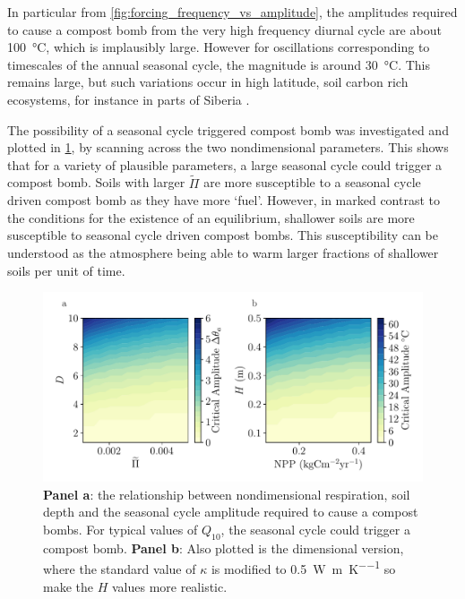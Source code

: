 In particular from \cref{fig:forcing_frequency_vs_amplitude}, 
the amplitudes required to cause a compost bomb from the very high frequency diurnal cycle are about \SI{100}{\degreeCelsius}, which is implausibly large.
However for oscillations corresponding to timescales of the annual seasonal cycle, the magnitude is around \SI{30}{\degreeCelsius}. This remains large,
but such variations occur in high latitude, soil carbon rich ecosystems, for instance in parts of Siberia \parencite{Peixoto1992}.

The possibility of a seasonal cycle triggered compost bomb was investigated and plotted in \cref{fig:critical_amplitude_to_be_triggered_by_the_seasonal_cycle},
by scanning across the two nondimensional parameters.
This shows that for a variety of plausible parameters, a large seasonal cycle could trigger a compost bomb. Soils with larger $\widetilde{\Pi}$ are more susceptible to a seasonal
cycle driven compost bomb as they have more `fuel'. However, in marked contrast to the conditions for the existence of an equilibrium, shallower soils are more susceptible to seasonal cycle driven
compost bombs. This susceptibility can be understood as the atmosphere being able to warm larger fractions of shallower soils per unit of time.


\begin{figure}
  \centering
  \includegraphics[scale=0.5,keepaspectratio]{seasonal_dim_and_nondim}
  \caption[Critical seasonal cycle for a compost bomb]{\textbf{Panel a}: the relationship between nondimensional respiration, soil depth and the seasonal cycle amplitude required to cause a compost bombs.
    For typical values of $Q_{10}$, the seasonal cycle could trigger a compost bomb. \textbf{Panel b}: Also plotted is the dimensional version, where the standard value
    of $\kappa$ is modified to \SI{0.5}{\watt\per\meter\per\kelvin} so make the $H$ values more realistic.}
  \label{fig:critical_amplitude_to_be_triggered_by_the_seasonal_cycle}
\end{figure}

